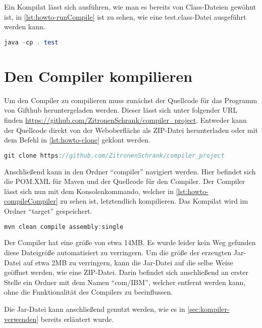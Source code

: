 Ein Kompilat lässt sich ausführen, wie man es bereits von Class-Dateien gewöhnt ist, in \cref{lst:howto-runCompile} ist zu sehen, wie eine test.class-Datei ausgeführt werden kann. 

\begin{lstlisting}[language=java, caption=Ein programm ausführen, label={lst:howto-runCompile}]
	java -cp . test
\end{lstlisting}

\section{Den Compiler kompilieren} \label{sec:compileCompiler}

Um den Compiler zu compilieren muss zunächst der Quellcode für das Programm von Gifthub heruntergeladen werden. Dieser lässt sich unter folgender URL finden \url{https://github.com/ZitronenSchrank/compiler_project}. Entweder kann der Quellcode direkt von der Weboberfläche als ZIP-Datei herunterladen oder mit dem Befehl in \cref{lst:howto-clone} geklont werden.

\begin{lstlisting}[language=java, caption=Das Repository klonen, label={lst:howto-clone}]
git clone https://github.com/ZitronenSchrank/compiler_project
\end{lstlisting}

Anschließend kann in den Ordner \enquote{compiler} navigiert werden. Hier befindet sich die POM.XML für Maven und der Quellcode für den Compiler. Der Compiler lässt sich nun mit dem Konsolenkommando, welcher in \cref{lst:howto-compileCompiler} zu sehen ist, letztendlich kompilieren. Das Kompilat wird im Ordner \enquote{target} gespeichert. 

\begin{lstlisting}[language=java, caption=Mit Maven den Compiler compilieren, label={lst:howto-compileCompiler}]
	mvn clean compile assembly:single
\end{lstlisting}

Der Compiler hat eine größe von etwa 14MB. Es wurde leider kein Weg gefunden diese Dateigröße automatisiert zu verringern. Um die größe der erzeugten Jar-Datei auf etwa 2MB zu verringern, kann die Jar-Datei auf die selbe Weise geöffnet werden, wie eine ZIP-Datei. Darin befindet sich anschließend an erster Stelle ein Ordner mit dem Namen \enquote{com/IBM}, welcher entfernt werden kann, ohne die Funktionalität des Compilers zu beeinflussen.

Die Jar-Datei kann anschließend genutzt werden, wie es in \cref{sec:kompiler-verwenden} bereits erläutert wurde.

